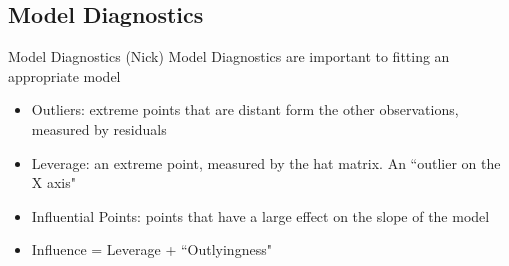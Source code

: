\documentclass[table]{beamer}\usepackage[]{graphicx}\usepackage[]{color}
\begin{document}

\subsection{Model Diagnostics}


\begin{frame}{Model Diagnostics (Nick)}
Model Diagnostics are important to fitting an appropriate model
\begin{itemize}
  \item Outliers: extreme points that are distant form the other observations, measured by residuals
  \item Leverage: an extreme point, measured by the hat matrix. An ``outlier on the X axis"
  \item Influential Points: points that have a large effect on the slope of the model
  \item Influence = Leverage + ``Outlyingness"
\end{itemize}
\end{frame}

\end{document}

